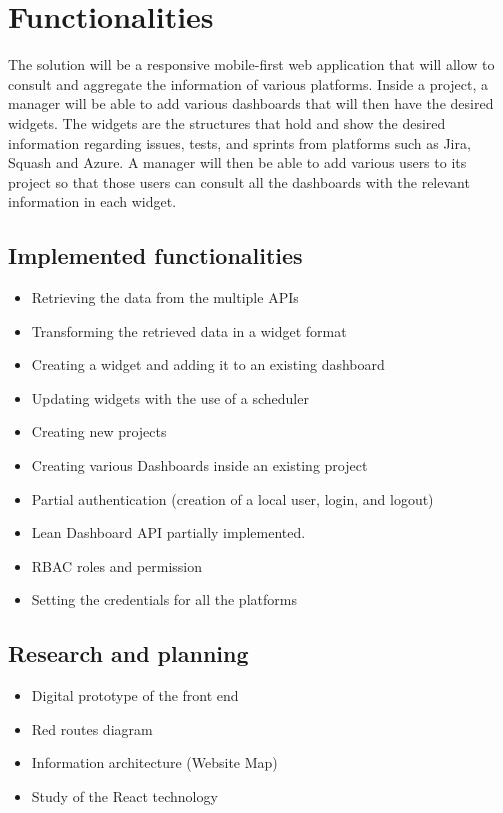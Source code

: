\documentclass[a4paper,twoside,10pt]{report}
\begin{document}
\section{Functionalities}
The solution will be a responsive mobile-first web application that will allow to consult and aggregate the information of various platforms. Inside a project, a manager will be able to add various dashboards that will then have the desired widgets. The widgets are the structures that hold and show the desired information regarding issues, tests, and sprints from platforms such as Jira, Squash and Azure. A manager will then be able to add various users to its project so that those users can consult all the dashboards with the relevant information in each widget.
\subsection{Implemented functionalities}
\begin{itemize}
    \item Retrieving the data from the multiple APIs
    \item Transforming the retrieved data in a widget format
    \item Creating a widget and adding it to an existing dashboard
    \item Updating widgets with the use of a scheduler
    \item Creating new projects
    \item Creating various Dashboards inside an existing project
    \item Partial authentication (creation of a local user, login, and logout)
    \item Lean Dashboard API partially implemented.
    \item RBAC roles and permission
    \item Setting the credentials for all the platforms
\end{itemize}

\newpage
\subsection{Research and planning}
\begin{itemize}
    \item Digital prototype of the front end
    \item Red routes diagram
    \item Information architecture (Website Map)
    \item Study of the React technology
\end{itemize}
\end{document}
